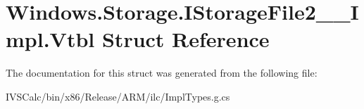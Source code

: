 \hypertarget{struct_windows_1_1_storage_1_1_i_storage_file2_____impl_1_1_vtbl}{}\section{Windows.\+Storage.\+I\+Storage\+File2\+\_\+\+\_\+\+Impl.\+Vtbl Struct Reference}
\label{struct_windows_1_1_storage_1_1_i_storage_file2_____impl_1_1_vtbl}


The documentation for this struct was generated from the following file\+:\begin{DoxyCompactItemize}
\item 
I\+V\+S\+Calc/bin/x86/\+Release/\+A\+R\+M/ilc/Impl\+Types.\+g.\+cs\end{DoxyCompactItemize}
